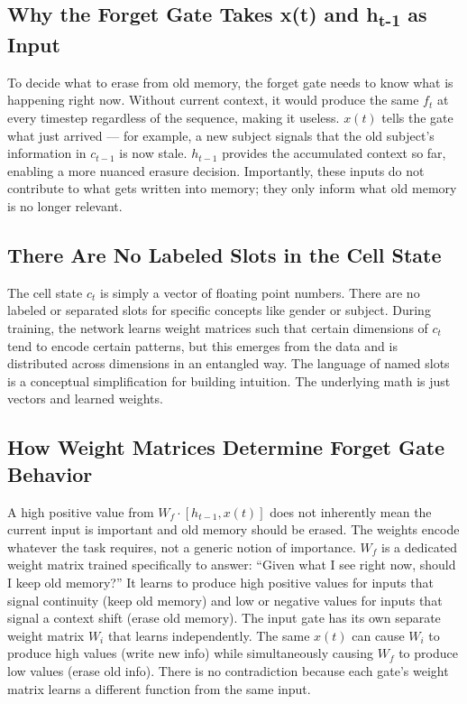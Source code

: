\subsection{Why the Forget Gate Takes x(t) and h\textsubscript{t-1} as Input}
To decide what to erase from old memory, the forget gate needs to know what is happening right now. Without current context, it would produce the same $f_t$ at every timestep regardless of the sequence, making it useless. $x(t)$ tells the gate what just arrived --- for example, a new subject signals that the old subject's information in $c_{t-1}$ is now stale. $h_{t-1}$ provides the accumulated context so far, enabling a more nuanced erasure decision. Importantly, these inputs do not contribute to what gets written into memory; they only inform what old memory is no longer relevant.

\subsection{There Are No Labeled Slots in the Cell State}
The cell state $c_t$ is simply a vector of floating point numbers. There are no labeled or separated slots for specific concepts like gender or subject. During training, the network learns weight matrices such that certain dimensions of $c_t$ tend to encode certain patterns, but this emerges from the data and is distributed across dimensions in an entangled way. The language of named slots is a conceptual simplification for building intuition. The underlying math is just vectors and learned weights.

\subsection{How Weight Matrices Determine Forget Gate Behavior}
A high positive value from $W_f \cdot [h_{t-1}, x(t)]$ does not inherently mean the current input is important and old memory should be erased. The weights encode whatever the task requires, not a generic notion of importance. $W_f$ is a dedicated weight matrix trained specifically to answer: ``Given what I see right now, should I keep old memory?'' It learns to produce high positive values for inputs that signal continuity (keep old memory) and low or negative values for inputs that signal a context shift (erase old memory). The input gate has its own separate weight matrix $W_i$ that learns independently. The same $x(t)$ can cause $W_i$ to produce high values (write new info) while simultaneously causing $W_f$ to produce low values (erase old info). There is no contradiction because each gate's weight matrix learns a different function from the same input.

